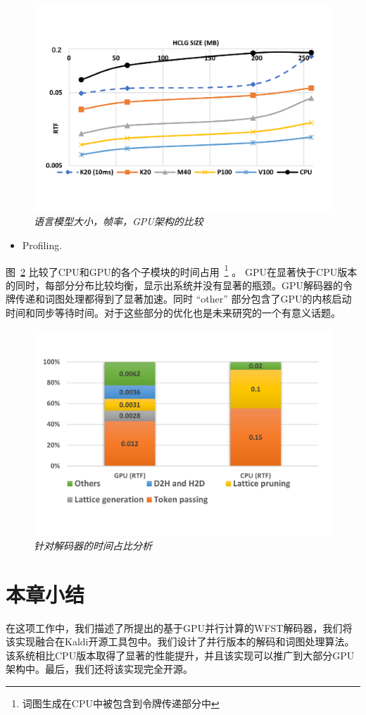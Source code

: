 \begin{figure}
  \centering
    \includegraphics[width=\linewidth]{figure/gpu_analysis.pdf}
    \caption{\it  语言模型大小，帧率，GPU架构的比较}
    \label{fig:exp-ana}
\end{figure}

\begin{itemize} 
   \item Profiling.
   \vspace{-0.25em}
 \end{itemize} 
  图~\ref{fig:exp-profile} 比较了CPU和GPU的各个子模块的时间占用~\footnote{词图生成在CPU中被包含到令牌传递部分中} 。
  GPU在显著快于CPU版本的同时，每部分分布比较均衡，显示出系统并没有显著的瓶颈。GPU解码器的令牌传递和词图处理都得到了显著加速。同时 ``other'' 部分包含了GPU的内核启动时间和同步等待时间。对于这些部分的优化也是未来研究的一个有意义话题。

\begin{figure}[ht]
  \centering
    \includegraphics[width=1\linewidth]{figure/gpu_profile.pdf}
    \caption{{\it 针对解码器的时间占比分析} }
    \label{fig:exp-profile}
\end{figure}



\section{本章小结}
\label{chap:gpu-sum}

在这项工作中，我们描述了所提出的基于GPU并行计算的WFST解码器，我们将该实现融合在Kaldi开源工具包中。我们设计了并行版本的解码和词图处理算法。该系统相比CPU版本取得了显著的性能提升，并且该实现可以推广到大部分GPU架构中。最后，我们还将该实现完全开源。
